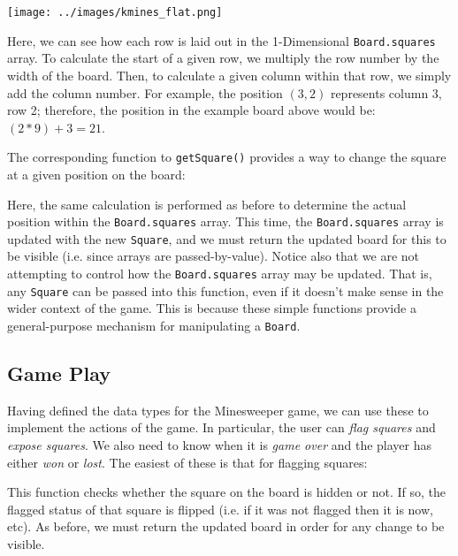 \begin{center}
\texttt{[image: ../images/kmines\_flat.png]}
\end{center}

Here, we can see how each row is laid out in the 1-Dimensional \lstinline{Board.squares} array.  To calculate the start of a given row, we multiply the row number by the width of the board.  Then, to calculate a given column within that row, we simply add the column number.  For example, the position $(3,2)$ represents column 3, row 2; therefore, the position in the example board above would be: $(2 * 9) + 3 = 21$.

The corresponding function to \lstinline{getSquare()} provides a way to change the square at a given position on the board:



Here, the same calculation is performed as before to determine the actual position within the \lstinline{Board.squares} array.  This time, the \lstinline{Board.squares} array is updated with the new \lstinline{Square}, and we must return the updated board for this to be visible (i.e. since arrays are passed-by-value).  Notice also that we are not attempting to control how the \lstinline{Board.squares} array may be updated.  That is, any \lstinline{Square} can be passed into this function, even if it doesn't make sense in the wider context of the game.  This is because these simple functions provide a general-purpose mechanism for manipulating a \lstinline{Board}.

\subsection{Game Play}

Having defined the data types for the Minesweeper game, we can use these to implement the actions of the game.  In particular, the user can {\em flag squares} and {\em expose squares}.  We also need to know when it is {\em game over} and the player has either {\em won} or {\em lost}.  The easiest of these is that for flagging squares:



This function checks whether the square on the board is hidden or not.  If so, the flagged status of that square is flipped (i.e. if it was not flagged then it is now, etc).  As before,  we must return the updated board in order for any change to be visible.

